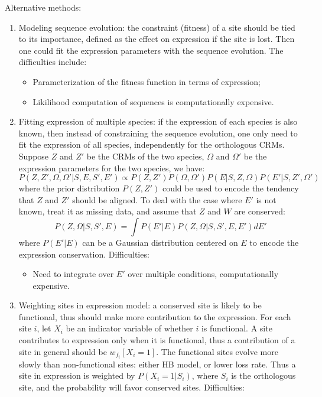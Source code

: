 \documentclass[11pt]{article}
\begin{document}
\begin{enumerate}
Alternative methods:
\begin{enumerate}
\item Modeling sequence evolution: the constraint (fitness) of a site should be tied to its importance, defined as the effect on expression if the site is lost. Then one could fit the expression parameters with the sequence evolution. The difficulties include: 
\begin{itemize}
\item Parameterization of the fitness function in terms of expression; 
\item Likilihood computation of sequences is computationally expensive. 
\end{itemize}
\item Fitting expression of multiple species: if the expression of each species is also known, then instead of constraining the sequence evolution, one only need to fit the expression of all species, independently for the orthologous CRMs. Suppose $Z$ and $Z'$ be the CRMs of the two species, $\Omega$ and $\Omega'$ be the expression parameters for the two species, we have: 
\begin{equation}
P(Z,Z',\Omega,\Omega'|S,E,S',E') \propto P(Z,Z') P(\Omega,\Omega') P(E|S,Z,\Omega) P(E'|S,Z',\Omega')
\end{equation}
where the prior distribution $P(Z,Z')$ could be used to encode the tendency that $Z$ and $Z'$ should be aligned. To deal with the case where $E'$ is not known, treat it as missing data, and assume that $Z$ and $W$ are conserved: 
\begin{equation}
P(Z,\Omega|S,S',E) = \int{P(E'|E) P(Z,\Omega|S,S',E,E') dE'}
\end{equation}
where $P(E'|E)$ can be a Gaussian distribution centered on $E$ to encode the expression conservation. Difficulties: 
\begin{itemize}
\item Need to integrate over $E'$ over multiple conditions, computationally expensive. 
\end{itemize}
\item Weighting sites in expression model: a conserved site is likely to be functional, thus should make more contribution to the expression. For each site $i$, let $X_i$ be an indicator variable of whether $i$ is functional. A site contributes to expression only when it is functional, thus a contribution of a site in general should be $w_{f_i} [X_i = 1]$. The functional sites evolve more slowly than non-functional sites: either HB model, or lower loss rate. Thus a site in expression is weighted by $P(X_i = 1|S_i)$, where $S_i$ is the orthologous site, and the probability will favor conserved sites. Difficulties: 

\end{enumerate}
\end{enumerate}
\end{document}

